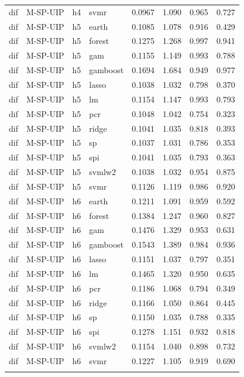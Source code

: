 \begin{ThreePartTable}
\begin{longtable}[t]{llclcccc}
dif & M-SP-UIP & h4 & svmr & 0.0967 & 1.090 & 0.965 & 0.727\\
\addlinespace
dif & M-SP-UIP & h5 & earth & 0.1085 & 1.078 & 0.916 & 0.429\\
dif & M-SP-UIP & h5 & forest & 0.1275 & 1.268 & 0.997 & 0.941\\
dif & M-SP-UIP & h5 & gam & 0.1155 & 1.149 & 0.993 & 0.788\\
dif & M-SP-UIP & h5 & gamboost & 0.1694 & 1.684 & 0.949 & 0.977\\
dif & M-SP-UIP & h5 & lasso & 0.1038 & 1.032 & 0.798 & 0.370\\
dif & M-SP-UIP & h5 & lm & 0.1154 & 1.147 & 0.993 & 0.793\\
dif & M-SP-UIP & h5 & pcr & 0.1048 & 1.042 & 0.754 & 0.323\\
dif & M-SP-UIP & h5 & ridge & 0.1041 & 1.035 & 0.818 & 0.393\\
dif & M-SP-UIP & h5 & sp & 0.1037 & 1.031 & 0.786 & 0.353\\
dif & M-SP-UIP & h5 & spi & 0.1041 & 1.035 & 0.793 & 0.363\\
dif & M-SP-UIP & h5 & svmlw2 & 0.1038 & 1.032 & 0.954 & 0.875\\
dif & M-SP-UIP & h5 & svmr & 0.1126 & 1.119 & 0.986 & 0.920\\
\addlinespace
dif & M-SP-UIP & h6 & earth & 0.1211 & 1.091 & 0.959 & 0.592\\
dif & M-SP-UIP & h6 & forest & 0.1384 & 1.247 & 0.960 & 0.827\\
dif & M-SP-UIP & h6 & gam & 0.1476 & 1.329 & 0.953 & 0.631\\
dif & M-SP-UIP & h6 & gamboost & 0.1543 & 1.389 & 0.984 & 0.936\\
dif & M-SP-UIP & h6 & lasso & 0.1151 & 1.037 & 0.797 & 0.351\\
dif & M-SP-UIP & h6 & lm & 0.1465 & 1.320 & 0.950 & 0.635\\
dif & M-SP-UIP & h6 & pcr & 0.1186 & 1.068 & 0.794 & 0.349\\
dif & M-SP-UIP & h6 & ridge & 0.1166 & 1.050 & 0.864 & 0.445\\
dif & M-SP-UIP & h6 & sp & 0.1150 & 1.035 & 0.788 & 0.335\\
dif & M-SP-UIP & h6 & spi & 0.1278 & 1.151 & 0.932 & 0.818\\
dif & M-SP-UIP & h6 & svmlw2 & 0.1154 & 1.040 & 0.898 & 0.732\\
dif & M-SP-UIP & h6 & svmr & 0.1227 & 1.105 & 0.919 & 0.690\\
\addlinespace

\end{longtable}
\end{ThreePartTable}
